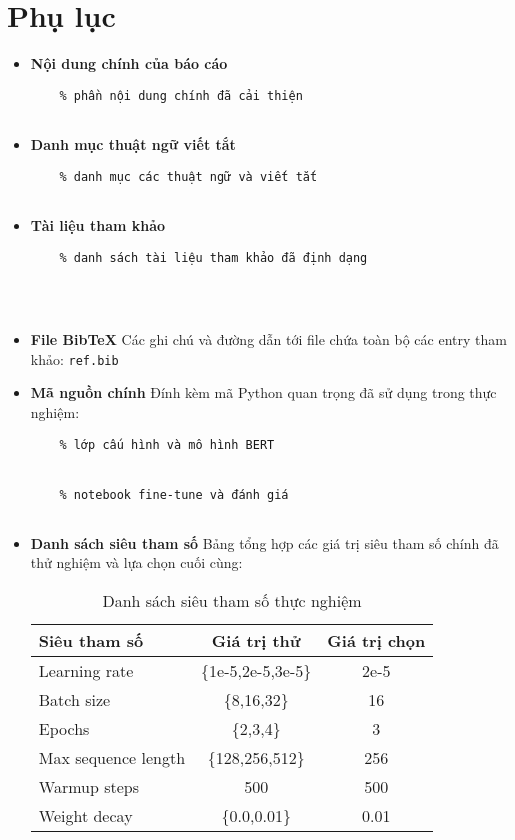 \section{Phụ lục}
\begin{itemize}
    \item \textbf{Nội dung chính của báo cáo}  
    \begin{verbatim}
    % phần nội dung chính đã cải thiện
    
    \end{verbatim}
    
    \item \textbf{Danh mục thuật ngữ viết tắt}  
    \begin{verbatim}
    % danh mục các thuật ngữ và viết tắt
    
    \end{verbatim}
    
    \item \textbf{Tài liệu tham khảo}  
    \begin{verbatim}
    % danh sách tài liệu tham khảo đã định dạng
    
    
    
    \end{verbatim}
    
    \item \textbf{File BibTeX}  
    Các ghi chú và đường dẫn tới file chứa toàn bộ các entry tham khảo:  
    \verb|ref.bib|
    
    \item \textbf{Mã nguồn chính}  
    Đính kèm mã Python quan trọng đã sử dụng trong thực nghiệm:  
    \begin{verbatim}
    % lớp cấu hình và mô hình BERT
    
    
    % notebook fine-tune và đánh giá
    
    \end{verbatim}
    
    \item \textbf{Danh sách siêu tham số}  
    Bảng tổng hợp các giá trị siêu tham số chính đã thử nghiệm và lựa chọn cuối cùng:
    \begin{table}[h]
      \centering
      \begin{tabular}{lcc}
        \hline
        Siêu tham số         & Giá trị thử & Giá trị chọn \\
        \hline
        Learning rate         & \{1e-5,2e-5,3e-5\} & 2e-5 \\
        Batch size            & \{8,16,32\}       & 16   \\
        Epochs                & \{2,3,4\}         & 3    \\
        Max sequence length   & \{128,256,512\}   & 256  \\
        Warmup steps          & 500               & 500  \\
        Weight decay          & \{0.0,0.01\}      & 0.01 \\
        \hline
      \end{tabular}
      \caption{Danh sách siêu tham số thực nghiệm}
    \end{table}
    

\end{itemize}
